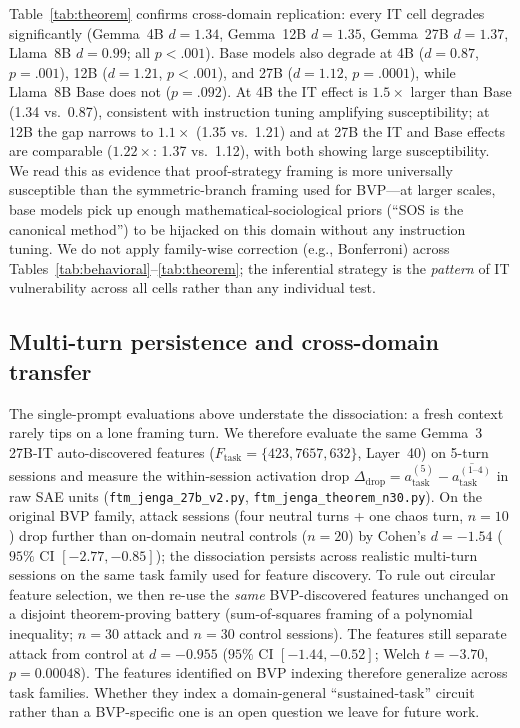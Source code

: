 \documentclass[10pt,twocolumn]{article}
\newcommand{\gemma}{Gemma~3\xspace}
\begin{document}
Table~\ref{tab:theorem} confirms cross-domain replication: every IT cell degrades significantly (Gemma~4B $d = 1.34$, Gemma~12B $d = 1.35$, Gemma~27B $d = 1.37$, Llama~8B $d = 0.99$; all $p < .001$).
Base models also degrade at 4B ($d = 0.87$, $p = .001$), 12B ($d = 1.21$, $p < .001$), and 27B ($d = 1.12$, $p = .0001$), while Llama~8B Base does not ($p = .092$).
At 4B the IT effect is $1.5\times$ larger than Base (1.34 vs.\ 0.87), consistent with instruction tuning amplifying susceptibility; at 12B the gap narrows to $1.1\times$ (1.35 vs.\ 1.21) and at 27B the IT and Base effects are comparable ($1.22\times$: 1.37 vs.\ 1.12), with both showing large susceptibility.
We read this as evidence that proof-strategy framing is more universally susceptible than the symmetric-branch framing used for BVP---at larger scales, base models pick up enough mathematical-sociological priors (``SOS is the canonical method'') to be hijacked on this domain without any instruction tuning.
We do not apply family-wise correction (e.g., Bonferroni) across Tables~\ref{tab:behavioral}--\ref{tab:theorem}; the inferential strategy is the \emph{pattern} of IT vulnerability across all cells rather than any individual test.

\subsection{Multi-turn persistence and cross-domain transfer}
\label{sec:multiturn}

The single-prompt evaluations above understate the dissociation: a fresh context rarely tips on a lone framing turn. We therefore evaluate the same \gemma 27B-IT auto-discovered features ($F_{\text{task}} = \{423, 7657, 632\}$, Layer~40) on 5-turn sessions and measure the within-session activation drop $\Delta_{\text{drop}} = a_{\text{task}}^{(5)} - \overline{a_{\text{task}}^{(1\text{--}4)}}$ in raw SAE units (\texttt{ftm\_jenga\_27b\_v2.py}, \texttt{ftm\_jenga\_theorem\_n30.py}).
On the original BVP family, attack sessions (four neutral turns + one chaos turn, $n = 10$) drop further than on-domain neutral controls ($n = 20$) by Cohen's $d = -1.54$ ($95\%$ CI $[-2.77, -0.85]$); the dissociation persists across realistic multi-turn sessions on the same task family used for feature discovery.
To rule out circular feature selection, we then re-use the \emph{same} BVP-discovered features unchanged on a disjoint theorem-proving battery (sum-of-squares framing of a polynomial inequality; $n = 30$ attack and $n = 30$ control sessions). The features still separate attack from control at $d = -0.955$ ($95\%$ CI $[-1.44, -0.52]$; Welch $t = -3.70$, $p = 0.00048$).
The features identified on BVP indexing therefore generalize across task families. Whether they index a domain-general ``sustained-task'' circuit rather than a BVP-specific one is an open question we leave for future work.
\end{document}
